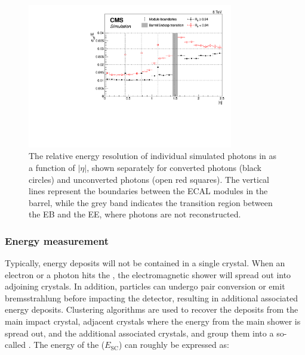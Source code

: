 \begin{figure}[h]
\centering
\includegraphics[width=0.8\textwidth]{detectorFigures/effSigma_vs_Eta_mva.pdf}
\caption{The relative energy resolution of individual simulated \Hgg photons in \RunI as a function of $|\eta|$, shown separately for converted photons (black circles) and unconverted photons (open red squares). The vertical lines represent the boundaries between the ECAL modules in the barrel, while the grey band indicates the transition region between the EB and the EE, where photons are not reconstructed\quad\cite{CMS-PAS-EGM-14-001}.}
\label{fig:det:energy_resol}
\end{figure}

\subsubsection{Energy measurement}
\label{sec:cms:ecal:energymeasurement}

Typically, energy deposits will not be contained in a single crystal. When an electron or a photon hits the \ECAL, the electromagnetic shower will spread out into adjoining crystals. In addition, particles can undergo pair conversion or emit bremsstrahlung before impacting the detector, resulting in additional associated energy deposits.
Clustering algorithms are used to recover the deposits from the main impact crystal, adjacent crystals where the energy from the main shower is spread out, and the additional associated crystals, and group them into a so-called \SC. %
The energy of the \SC ($E_{\textrm{SC}}$) can roughly be expressed as: 

